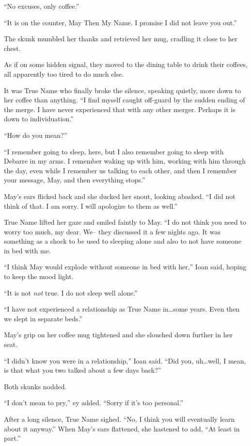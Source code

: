 ``No excuses, only coffee.''

``It is on the counter, May Then My Name. I promise I did not leave you out.''

The skunk mumbled her thanks and retrieved her mug, cradling it close to her chest.

As if on some hidden signal, they moved to the dining table to drink their coffees, all apparently too tired to do much else.

It was True Name who finally broke the silence, speaking quietly, more down to her coffee than anything. ``I find myself caught off-guard by the sudden ending of the merge. I have never experienced that with any other merger. Perhaps it is down to individuation.''

``How do you mean?''

``I remember going to sleep, here, but I also remember going to sleep with Debarre in my arms. I remember waking up with him, working with him through the day, even while I remember us talking to each other, and then I remember your message, May, and then everything stops.''

May's ears flicked back and she ducked her snout, looking abashed. ``I did not think of that. I am sorry. I will apologize to them as well.''

True Name lifted her gaze and smiled faintly to May. ``I do not think you need to worry too much, my dear. We-- they discussed it a few nights ago. It was something as a shock to be used to sleeping alone and also to not have someone in bed with me.

``I think May would explode without someone in bed with her,'' Ioan said, hoping to keep the mood light.

``It is not \emph{not} true. I do not sleep well alone.''

``I have not experienced a relationship as True Name in\ldots some years. Even then we slept in separate beds.''

May's grip on her coffee mug tightened and she slouched down further in her seat.

``I didn't know you were in a relationship,'' Ioan said. ``Did you, uh\ldots well, I mean, is that what you two talked about a few days back?''

Both skunks nodded.

``I don't mean to pry,'' ey added. ``Sorry if it's too personal.''

After a long silence, True Name sighed. ``No, I think you will eventually learn about it anyway.'' When May's ears flattened, she hastened to add, ``At least in part.''

